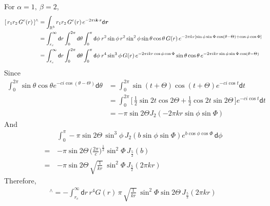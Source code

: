 \documentclass[aps,pre,preprint]{revtex4}
\renewcommand{\v}[1]{\textbf{\textit{#1}}}
\renewcommand{\d}[1]{\textsf{#1}}
\begin{document}
For $\alpha = 1,\ \beta = 2$,
\begin{align}\nonumber
  [\,r_1 r_2\,G^c(r)\,]^{\wedge} 
  &= \int_{\mathbb R^3} r_1 r_2\,G^c(r)\, e^{-2\pi i\v k\cdot\v r}\d d\v r \\\nonumber
  &= \int_{r_c}^\infty \d dr \int_{0}^{2\pi} \d d\theta \int_0^\pi\d d\phi\:
  r^2\sin\phi \,r^2 \sin^2\phi \sin\theta\cos\theta \,G(r)\,
  e^{-2\pi k r[\sin\phi\sin\Phi\cos(\theta - \Theta) + \cos\phi\cos\Phi]} \\
  &= \int_{r_c}^\infty \d dr \int_{0}^{2\pi} \d d\theta \int_0^\pi\d d\phi\:
  r^4\sin^3\phi\,G(r)\,e^{-2\pi i kr\cos\phi\cos\Phi}
  \sin\theta\cos\theta\,e^{-2\pi i kr\sin\phi\sin\Phi\cos(\theta- \Theta)}
\end{align}
Since
\begin{align}\nonumber
  \int_0^{2\pi}\sin\theta\cos\theta e^{-c i\cos(\theta - \Theta)} \d d\theta
  & =
  \int_0^{2\pi}\sin(t+\Theta)\cos(t+\Theta)
  e^{-c i \cos t} \d dt \\\nonumber
  &=
  \int_0^{2\pi}
  \Big[\,
  \frac12 \sin 2t\cos 2\Theta + \frac12\cos 2t\sin 2\Theta
  \,\Big]
  e^{-c i\cos t} \d dt \\\nonumber
  &=
  -\pi \sin 2\Theta J_2(-2\pi kr\sin\phi\sin\Phi)
\end{align}
And
\begin{align}\nonumber
  &
  \int_0^\pi -\pi \sin 2\Theta\,
  \sin^3\phi\,
  J_2(b\sin\phi\sin\Phi) e^{b\cos\phi\cos\Phi} \,\d d\phi \\\nonumber
  = \,&
  -\pi\sin 2\Theta\,
  \big(
  \frac{2\pi}{c}
  \big)^{\frac12}
  \sin^2\Phi \,J_{\frac52}(b) \\\nonumber
  = \,&
  -\pi\sin 2\Theta\,
  \sqrt{\frac1{kr}}\:
  \sin^2\Phi \,J_{\frac52}(2\pi kr) 
\end{align}
Therefore,
\begin{align}
  [\,r_1 r_2\,G^c(r)\,]^{\wedge} 
  =
  -\int_{r_c}^\infty
  \d dr\,
  r^4G(r)\,\pi\,
  \sqrt{\frac1{kr}}\:
  \sin^2\Phi\sin 2\Theta\,J_{\frac52}(2\pi kr)\,
\end{align}
\end{document}
